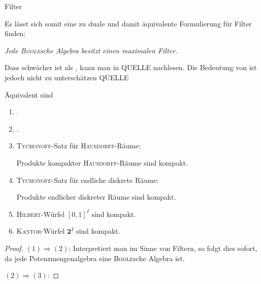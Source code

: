 \begin{defn}
  Filter
\end{defn}

Es lässt sich somit eine zu \PIT duale und damit äquivalente Formulierung für Filter finden:
  \begin{addmargin}[2em]{2em}%
    \textit{Jede \textsc{Boole}sche Algebra besitzt einen maximalen Filter.}
  \end{addmargin}

Dass \PIT schwächer ist als \AC, kann man in QUELLE nachlesen.
Die Bedeutung von \PIT ist jedoch nicht zu unterschätzen QUELLE

\begin{thm}
  Äquivalent sind
\begin{enumerate}[(1)]
    \item \PIT.
    \item \UFT.
    \item \textsc{Tychonoff}-Satz für \textsc{Hausdorff}-Räume: 
      \begin{addmargin}[2em]{2em}%
        Produkte kompakter \textsc{Hausdorff}-Räume sind kompakt.
      \end{addmargin}
    \item \textsc{Tychonoff}-Satz für endliche diskrete Räume: 
      \begin{addmargin}[2em]{2em}%
        Produkte endlicher diskreter Räume sind kompakt.
      \end{addmargin}
    \item \textsc{Hilbert}-Würfel $[0,1]^I$ sind kompakt.
    \item \textsc{Kantor}-Würfel $\mathbf{2}^I$ sind kompakt.
  \end{enumerate}

  \begin{proof}
    $(1)\Rightarrow(2)$: 
    Interpretiert man \PIT im Sinne von Filtern, so folgt dies sofort, da jede Potenzmengenalgebra eine \textsc{Boole}sche Algebra ist.

    $(2)\Rightarrow(3)$:

  \end{proof}

\end{thm}

